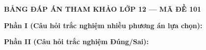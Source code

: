 
\newpage
\begin{center} \textbf{BẢNG ĐÁP ÁN THAM KHẢO LỚP 12 --- MÃ ĐỀ 101} \end{center}

\noindent \textbf{Phần I (Câu hỏi trắc nghiệm nhiều phương án lựa chọn):}  

\noindent \textbf{Phần II (Câu hỏi trắc nghiệm Đúng/Sai):}

\label{B\thedeso}

